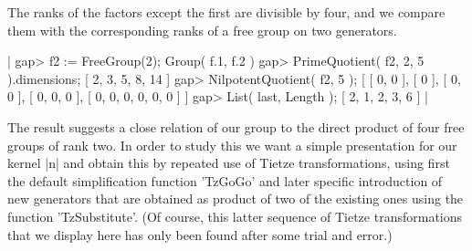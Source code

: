 The ranks of the factors except the first  are divisible by four,  and we
compare  them  with  the  corresponding ranks  of a  free  group  on  two
generators.

|    gap> f2 := FreeGroup(2);
    Group( f.1, f.2 )
    gap> PrimeQuotient( f2, 2, 5 ).dimensions;
    [ 2, 3, 5, 8, 14 ]
    gap> NilpotentQuotient( f2, 5 );
    [ [ 0, 0 ], [ 0 ], [ 0, 0 ], [ 0, 0, 0 ], [ 0, 0, 0, 0, 0, 0 ] ]
    gap> List( last, Length );
    [ 2, 1, 2, 3, 6 ] |

The result suggests a close relation of our  group to  the direct product
of four free groups of rank two.  In order to study this we want a simple
presentation for our kernel |n| and obtain this by repeated use of Tietze
transformations, using first the default simplification function 'TzGoGo'
and  later specific introduction of  new generators  that are obtained as
product of two of  the existing ones  using  the function 'TzSubstitute'.
(Of  course,  this  latter  sequence  of  Tietze transformations that  we
display here has only been found after some trial and error.)

